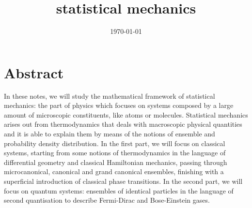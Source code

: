 \documentclass[a4paper, 12pt]{memoir}
\title{statistical mechanics}
\date{\today}
\begin{document}
\frontmatter



\tableofcontents

\mainmatter



\chapter*{Abstract}

    In these notes, we will study the mathematical framework of statistical mechanics: the part of physics which focuses on systems composed by a large amount of microscopic constituents, like atoms or molecules. Statistical mechanics arises out from thermodynamics that deals with macroscopic physical quantities and it is able to explain them by means of the notions of ensemble and probability density distribution. In the first part, we will focus on classical systems, starting from some notions of thermodynamics in the language of differential geometry and classical Hamiltonian mechanics, passing through microcanonical, canonical and grand canonical ensembles, finishing with a superficial introduction of classical phase transitions. In the second part, we will focus on quantum systems: ensembles of identical particles in the language of second quantisation to describe Fermi-Dirac and Bose-Einstein gases.
    








\backmatter

\nocite{smlecture}
\nocite{ercolessi}

\clearpage
{}
\printbibliography
\end{document}
